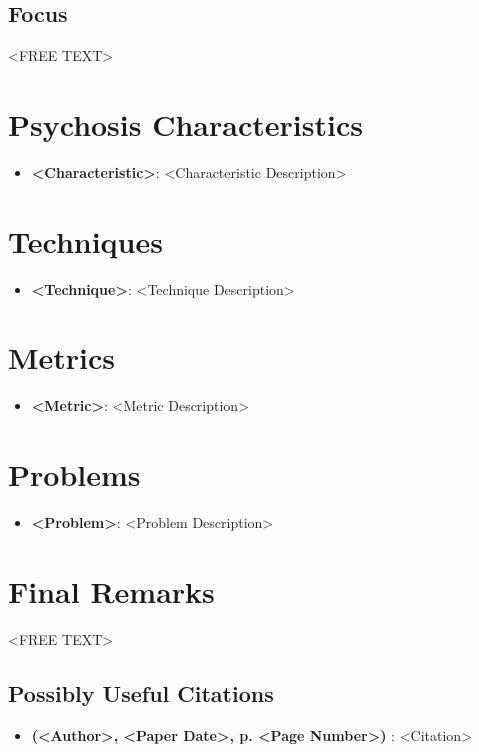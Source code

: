 \documentclass{Paper_Summary}
\begin{document}
\makepapertitle

\breakline

\begin{center}
    \section*{Focus}
\end{center}
    <FREE TEXT>

\breakline

\newpage

\section{Psychosis Characteristics}
    \begin{itemize}
        \item \textbf{<Characteristic>}: <Characteristic Description>
    \end{itemize}

\section{Techniques}
    \begin{itemize}
        \item \textbf{<Technique>}: <Technique Description>
    \end{itemize}

\section{Metrics}
    \begin{itemize}
        \item \textbf{<Metric>}: <Metric Description>
    \end{itemize}

\section{Problems}
    \begin{itemize}
        \item \textbf{<Problem>}: <Problem Description>
    \end{itemize}


\section{Final Remarks}
    <FREE TEXT>

\breakline

\begin{center}
    \section*{Possibly Useful Citations}
\end{center}

    \begin{itemize}
        \item \textbf{(<Author>, <Paper Date>, p. <Page Number>)} : <Citation>
    \end{itemize}
\end{document}
